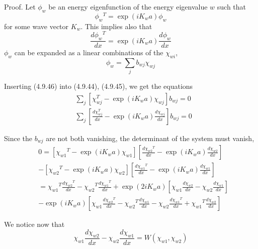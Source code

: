 \documentclass{article}
\begin{document}
Proof. Let $\phi_{w}$ be an energy eigenfunction of the energy eigenvalue $w$ such that
$$
\begin{equation*}
\phi_{w}{ }^{T}=\exp \left(i K_{w} a\right) \phi_{w} \tag{4.9.44}
\end{equation*}
$$
for some wave vector $K_{w}$. This implies also that
$$
\begin{equation*}
\frac{d \phi_{w}{ }^{T}}{d x}=\exp \left(i K_{w} a\right) \frac{d \phi_{w}}{d x} \tag{4.9.45}
\end{equation*}
$$
$\phi_{w}$ can be expanded as a linear combinations of the $\chi_{w i}$,
$$
\begin{equation*}
\phi_{w}=\sum_{j} b_{w j} \chi_{w j} \tag{4.9.46}
\end{equation*}
$$

Inserting (4.9.46) into (4.9.44), (4.9.45), we get the equations
$$
\begin{align*}
& \sum_{j}\left[\chi_{w j}^{T}-\exp \left(i K_{w} a\right) \chi_{w j}\right] b_{w j}=0  \tag{4.9.47a}\\
& \sum_{j}\left[\frac{d \chi_{w j}^{T}}{d x}-\exp \left(i K_{w} a\right) \frac{d \chi_{w j}}{d x}\right] b_{w j}=0 \tag{4.9.47b}
\end{align*}
$$

Since the $b_{w j}$ are not both vanishing, the determinant of the system must vanish,
$$
\begin{align*}
& 0=\left[\chi_{w 1}{ }^{T}-\exp \left(i K_{w} a\right) \chi_{w 1}\right]\left[\frac{d \chi_{w 2}{ }^{T}}{d x}-\exp \left(i K_{w} a\right) \frac{d \chi_{w 2}}{d x}\right]  \tag{4.9.48}\\
& -\left[\chi_{w 2}{ }^{T}-\exp \left(i K_{w} a\right) \chi_{w 2}\right]\left[\frac{d \chi_{w 1}{ }^{T}}{d x}-\exp \left(i K_{w} a\right) \frac{d \chi_{w 1}}{d x}\right] \\
& =\chi_{w 1}{ }^{T} \frac{d \chi_{w 2}{ }^{T}}{d x}-\chi_{w 2}{ }^{T} \frac{d \chi_{w 1}{ }^{T}}{d x}+\exp \left(2 i K_{w} a\right)\left[\chi_{w 1} \frac{d \chi_{w 2}}{d x}-\chi_{w 2} \frac{d \chi_{w 1}}{d x}\right] \\
& -\exp \left(i K_{w} a\right)\left[\chi_{w 1} \frac{d \chi_{w 2}{ }^{T}}{d x}-\chi_{w 2}{ }^{T} \frac{d \chi_{w 1}}{d x}-\chi_{w 2} \frac{d \chi_{w 1}{ }^{T}}{d x}+\chi_{w 1}{ }^{T} \frac{d \chi_{w 2}}{d x}\right]
\end{align*}
$$

We notice now that
$$
\begin{equation*}
\chi_{w 1} \frac{d \chi_{w 2}}{d x}-\chi_{w 2} \frac{d \chi_{w 1}}{d x}=W\left(\chi_{w 1}, \chi_{w 2}\right) \tag{4.9.49}
\end{equation*}
$$
\end{document}
